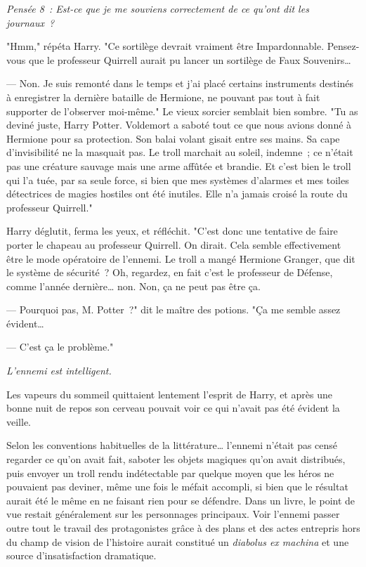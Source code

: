 \emph{Pensée 8~: Est-ce que je me souviens correctement de ce qu'ont dit les journaux~?}

"Hmm," répéta Harry. "Ce sortilège devrait vraiment être Impardonnable. Pensez-vous que le professeur Quirrell aurait pu lancer un sortilège de Faux Souvenirs…

--- Non. Je suis remonté dans le temps et j'ai placé certains instruments destinés à enregistrer la dernière bataille de Hermione, ne pouvant pas tout à fait supporter de l'observer moi-même." Le vieux sorcier semblait bien sombre. "Tu as deviné juste, Harry Potter. Voldemort a saboté tout ce que nous avions donné à Hermione pour sa protection. Son balai volant gisait entre ses mains. Sa cape d'invisibilité ne la masquait pas. Le troll marchait au soleil, indemne~; ce n'était pas une créature sauvage mais une arme affûtée et brandie. Et c'est bien le troll qui l'a tuée, par sa seule force, si bien que mes systèmes d'alarmes et mes toiles détectrices de magies hostiles ont été inutiles. Elle n'a jamais croisé la route du professeur Quirrell."

Harry déglutit, ferma les yeux, et réfléchit. "C'est donc une tentative de faire porter le chapeau au professeur Quirrell. On dirait. Cela semble effectivement être le mode opératoire de l'ennemi. Le troll a mangé Hermione Granger, que dit le système de sécurité~? Oh, regardez, en fait c'est le professeur de Défense, comme l'année dernière… non. Non, ça ne peut pas être ça.

--- Pourquoi pas, M. Potter~?" dit le maître des potions. "Ça me semble assez évident…

--- C'est ça le problème."

\emph{L'ennemi est intelligent.}

Les vapeurs du sommeil quittaient lentement l'esprit de Harry, et après une bonne nuit de repos son cerveau pouvait voir ce qui n'avait pas été évident la veille.

Selon les conventions habituelles de la littérature… l'ennemi n'était pas censé regarder ce qu'on avait fait, saboter les objets magiques qu'on avait distribués, puis envoyer un troll rendu indétectable par quelque moyen que les héros ne pouvaient pas deviner, même une fois le méfait accompli, si bien que le résultat aurait été le même en ne faisant rien pour se défendre. Dans un livre, le point de vue restait généralement sur les personnages principaux. Voir l'ennemi passer outre tout le travail des protagonistes grâce à des plans et des actes entrepris hors du champ de vision de l'histoire aurait constitué un \emph{diabolus ex machina} et une source d'insatisfaction dramatique.


